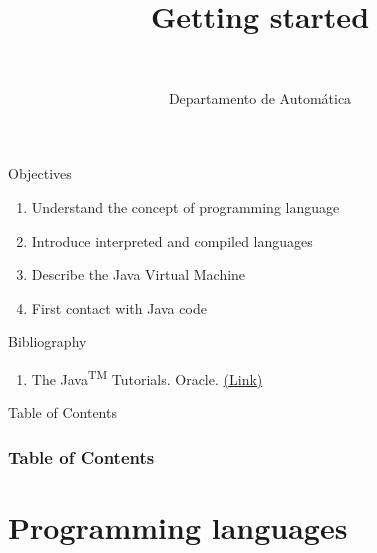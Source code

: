 \documentclass[10pt,compress]{beamer} %
\title[Getting started]{Getting started}
\author{\asignatura\\\carrera}
\institute{}
\date{Departamento de Automática}
\begin{document}
{\titlepageBlue
    \begin{frame}
        \titlepage
    \end{frame}
}

\institute{\asignatura}

\begin{frame}[plain]{}
   \begin{block}{Objectives}
      \begin{enumerate}
         \item Understand the concept of programming language
         \item Introduce interpreted and compiled languages
         \item Describe the Java Virtual Machine
         \item First contact with Java code
      \end{enumerate} 
   \end{block}

   \begin{block}{Bibliography}
      \begin{enumerate}
          \item The Java\textsuperscript{TM} Tutorials. Oracle. \href{https://docs.oracle.com/javase/tutorial/}{(Link)}
      \end{enumerate} 
   \end{block}


\end{frame}

{
\begin{frame}[shrink]{Table of Contents}
 \frametitle{Table of Contents}
 \tableofcontents
\end{frame}
}

\section{Programming languages}
\end{document}

